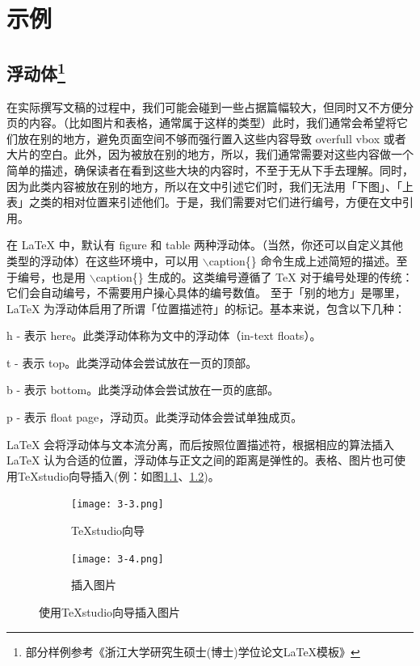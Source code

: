 \chapter{示例}\label{chap:sample}

\section{浮动体\footnote{部分样例参考《浙江大学研究生硕士(博士)学位论文\LaTeX{}模板》}}
在实际撰写文稿的过程中，我们可能会碰到一些占据篇幅较大，但同时又不方便分页的内容。（比如图片和表格，通常属于这样的类型）此时，我们通常会希望将它们放在别的地方，避免页面空间不够而强行置入这些内容导致 overfull vbox 或者大片的空白。此外，因为被放在别的地方，所以，我们通常需要对这些内容做一个简单的描述，确保读者在看到这些大块的内容时，不至于无从下手去理解。同时，因为此类内容被放在别的地方，所以在文中引述它们时，我们无法用「下图」、「上表」之类的相对位置来引述他们。于是，我们需要对它们进行编号，方便在文中引用。

在 \LaTeX{} 中，默认有 figure 和 table 两种浮动体。（当然，你还可以自定义其他类型的浮动体）在这些环境中，可以用 $\backslash$caption\{\} 命令生成上述简短的描述。至于编号，也是用 $\backslash$caption\{\} 生成的。这类编号遵循了 TeX 对于编号处理的传统：它们会自动编号，不需要用户操心具体的编号数值。 至于「别的地方」是哪里，\LaTeX{} 为浮动体启用了所谓「位置描述符」的标记。基本来说，包含以下几种：

h - 表示 here。此类浮动体称为文中的浮动体（in-text floats）。

t - 表示 top。此类浮动体会尝试放在一页的顶部。

b - 表示 bottom。此类浮动体会尝试放在一页的底部。

p - 表示 float page，浮动页。此类浮动体会尝试单独成页。

\LaTeX{} 会将浮动体与文本流分离，而后按照位置描述符，根据相应的算法插入 \LaTeX{} 认为合适的位置，浮动体与正文之间的距离是弹性的。表格、图片也可使用TeXstudio向导插入(例：如图\ref{subfig:3a}、\ref{subfig:3b})。

\begin{figure}[htb!]
	\centering
	\begin{subfigure}[b]{.4\textwidth}
		\centering
		\texttt{[image: 3-3.png]}
		\caption{TeXstudio向导}\label{subfig:3a}
	\end{subfigure}
	\begin{subfigure}[b]{.4\textwidth}
		\centering
		\texttt{[image: 3-4.png]}
		\caption{插入图片}\label{subfig:3b}
	\end{subfigure}
	\caption{使用TeXstudio向导插入图片}\label{fig:3}
\end{figure}

